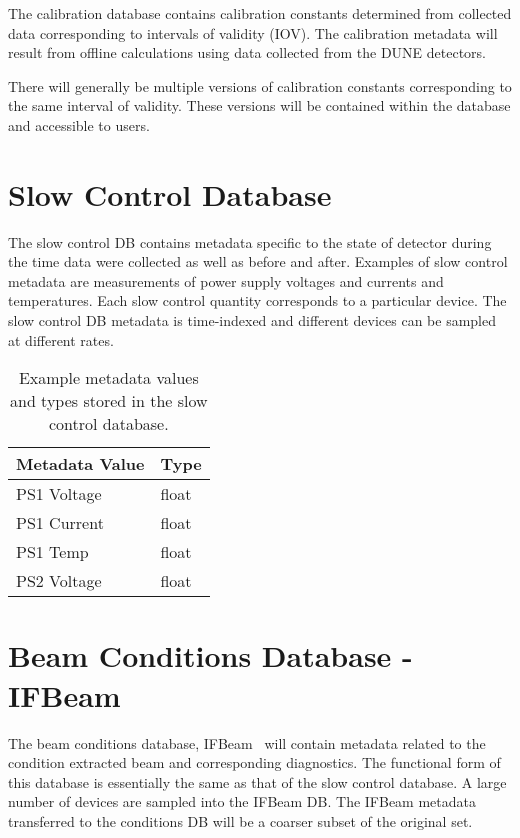 The calibration database contains calibration constants determined from collected data corresponding to intervals of validity (IOV). The calibration metadata will result from offline calculations using data collected from the DUNE detectors.

There will generally be multiple versions of calibration constants corresponding to the same interval of validity. These versions will be contained within the database and accessible to users.  


\section{Slow Control Database}
\label{sec:db:slowcontrol}  

The slow control DB contains metadata specific to the state of detector during the time data were collected as well as before and after. Examples of slow control metadata are measurements of power supply voltages and currents and temperatures. Each slow control quantity corresponds to a particular device. The slow control DB metadata is time-indexed and different devices can be sampled at different rates.

\begin{table}[h!]
\centering
 \begin{tabular}{||l| l ||} 
 \hline
 Metadata Value & Type  \\ [0.5ex] 
 \hline\hline
PS1 Voltage  & float \\ \hline
PS1 Current  & float  \\ \hline
PS1 Temp  &  float \\ \hline
PS2 Voltage & float \\ [1ex] 
\hline
\end{tabular}
\caption{Example metadata values and types stored in the slow control database.}
\label{table:sc}
\end{table}

\section{Beam Conditions Database - IFBeam}
\label{sec:db:ifbeam}  

The beam conditions database, IFBeam~\cite{ifbeam} will contain metadata related to the condition extracted beam and corresponding diagnostics.  The functional form of this database is essentially the same as that of the slow control database. A large number of devices are sampled into the IFBeam DB. The IFBeam metadata transferred to the conditions DB will be a coarser subset of the original set.

